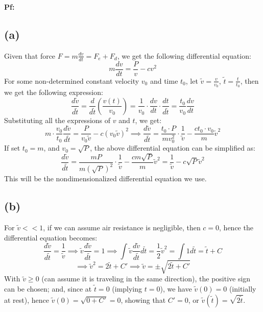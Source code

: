 \documentclass{article}
\begin{document}
\textbf{Pf:}
\subsection*{(a)}
Given that force $F=m\frac{dv}{dt}=F_e + F_d$, we get the following differential equation:
$$m\frac{dv}{dt}=\frac{P}{v}-cv^2$$
For some non-determined constant velocity $v_0$ and time $t_0$, let $\tilde{v}=\frac{v}{v_0}$, $\tilde{t}=\frac{t}{t_0}$, then we get the following expression:
$$\frac{d\tilde{v}}{d\tilde{t}} = \frac{d}{d\tilde{t}}\left(\frac{v(t)}{v_0}\right) = \frac{1}{v_0}\cdot \frac{dv}{dt}\cdot \frac{dt}{d \tilde{t}} = \frac{t_0}{v_0}\frac{dv}{dt}$$
Substituting all the expressions of $v$ and $t$, we get:
$$m\cdot \frac{v_0}{t_0}\frac{d\tilde{v}}{d\tilde{t}} = \frac{P}{v_0\tilde{v}}-c(v_0\tilde{v})^2\implies \frac{d\tilde{v}}{d\tilde{t}}=\frac{t_0\cdot P}{mv_0^2}\cdot\frac{1}{\tilde{v}}-\frac{ct_0\cdot v_0}{m}\tilde{v}^2$$
If set $t_0=m$, and $v_0 = \sqrt{P}$, the above differential equation can be simplified as:
$$\frac{d\tilde{v}}{d\tilde{t}}=\frac{mP}{m(\sqrt{P})^2}\cdot\frac{1}{\tilde{v}}-\frac{cm\sqrt{P}}{m}\tilde{v}^2 = \frac{1}{\tilde{v}}-c\sqrt{P}\tilde{v}^2$$
This will be the nondimensionalized differential equation we use.

\hfil

\subsection*{(b)}
For $\tilde{v}<<1$, if we can assume air resistance is negligible, then $c=0$, hence the differential equation becomes:
$$\frac{d\tilde{v}}{d\tilde{t}}=\frac{1}{\tilde{v}} \implies \tilde{v}\frac{d\tilde{v}}{d\tilde{t}}=1\implies \int \tilde{v}\frac{d\tilde{v}}{d\tilde{t}}d\tilde{t} = \frac{1}{2}\tilde{v}^2 = \int 1d\tilde{t}=\tilde{t}+C$$
$$\implies \tilde{v}^2 = 2\tilde{t}+C' \implies \tilde{v}=\pm\sqrt{2\tilde{t}+C'}$$
With $\tilde{v}\geq 0$ (can assume it is traveling in the same direction), the positive sign can be chosen; and, since at $\tilde{t}=0$ (implying $t=0$), we have $\tilde{v}(0)=0$ (initially at rest), hence $\tilde{v}(0) = \sqrt{0+C'} = 0$, showing that $C' = 0$, or $\tilde{v}(\tilde{t}) = \sqrt{2\tilde{t}}$.

\hfil
\end{document}

